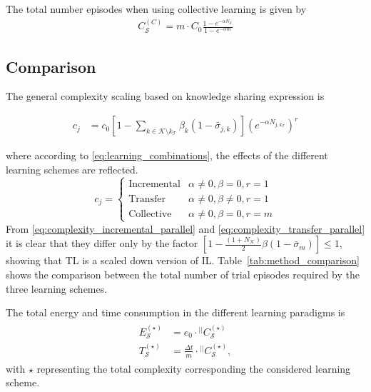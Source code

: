 The total number episodes when using collective learning is given by
\begin{eqnarray}
	C_\mathcal{S}^{(C)} = m \cdot C_0 \frac{1 - e^{-\alpha N_\mathcal{S}}}{1 - e^{-\alpha m}}
\end{eqnarray}
\subsection{Comparison}
 The general complexity scaling based on knowledge sharing expression is
\begin{tcolorbox}
	\begin{align}
		c_j &= c_0\left[1- \sum\limits_{k \in \mathcal{K} \setminus k_\mathcal{T}}\beta_k \left( 1 - \bar{\sigma}_{j,k} \right)\right] \left(e^{-\alpha N_{j,k_\mathcal{T}}} \right)^r
	\end{align}
\end{tcolorbox}
 where according to \eqref{eq:learning_combinations}, the effects of the different learning schemes are reflected.
 \begin{equation}
	 c_j =
	     \begin{cases} 
		       \text{Incremental} & \alpha\neq 0, \beta=0,  r=1 \\
		       \text{Transfer} & \alpha\neq 0, \beta \neq 0, r = 1 \\
		       \text{Collective} & \alpha\neq 0, \beta = 0, r=m 
		   \end{cases}
	   \label{eq:learning_combinations}
\end{equation}
From \eqref{eq:complexity_incremental_parallel} and \eqref{eq:complexity_transfer_parallel} it is clear that they differ only by the factor $ \left[1 - \frac{\left(1+N_\mathcal{K}\right)}{2}\beta \left(1-\bar{\sigma}_m\right)\right] \leq 1$, showing that TL is a scaled down version of IL. Table~\ref{tab:method_comparison} shows the comparison between the total number of trial episodes required by the three learning schemes.

The total energy and time consumption in the different learning paradigms is
\begin{align}
	\begin{split}
		E^{(\star)}_{\mathcal{S}} &= e_{0} \cdot {}^{\lvert \lvert}C_\mathcal{S}^{(\star)}\\
		T^{(\star)}_{\mathcal{S}} &= \frac{\Delta t}{m} \cdot {}^{\lvert \lvert}C_\mathcal{S}^{(\star)},
	\end{split}
\end{align}
with $ \star $ representing the total complexity corresponding the considered learning scheme.

